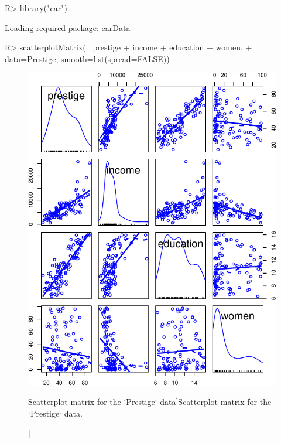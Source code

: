 \documentclass[
]{jss}
\begin{document}
\begin{CodeChunk}
\begin{CodeInput}
R> library("car")
\end{CodeInput}
\begin{CodeOutput}
Loading required package: carData
\end{CodeOutput}
\begin{CodeInput}
R> scatterplotMatrix(~ prestige + income + education + women,
+                   data=Prestige, smooth=list(spread=FALSE))
\end{CodeInput}
\begin{figure}

{\centering \includegraphics[width=1\linewidth]{JSS-article-reduced_files/figure-latex/scatterplot-matrix-1} 

}

\caption[Scatterplot matrix for the `Prestige` data]{Scatterplot matrix for the `Prestige` data.}\label{fig:scatterplot-matrix}
\end{figure}
\end{CodeChunk}
\end{document}
